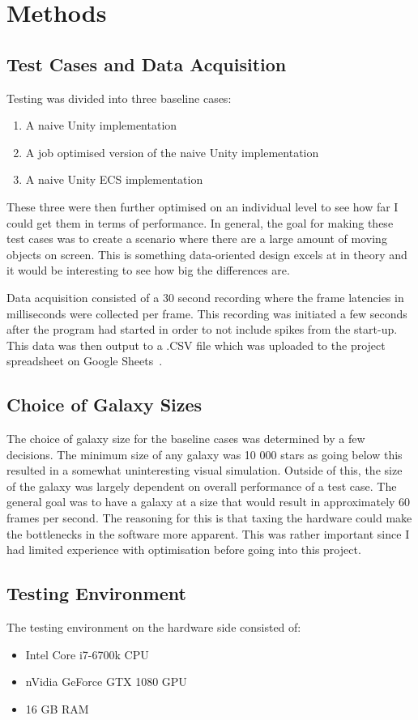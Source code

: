 \chapter{Methods}
\section{Test Cases and Data Acquisition}
Testing was divided into three baseline cases:
\begin{enumerate}
    \item A naive Unity implementation
    \item A job optimised version of the naive Unity implementation
    \item A naive Unity ECS implementation
\end{enumerate}
These three were then further optimised on an individual level to see how far I could get them in terms of performance. In general, the goal for making these test cases was to create a scenario where there are a large amount of moving objects on screen. This is something data-oriented design excels at in theory and it would be interesting to see how big the differences are. 

Data acquisition consisted of a 30 second recording where the frame latencies in milliseconds were collected per frame. This recording was initiated a few seconds after the program had started in order to not include spikes from the start-up. This data was then output to a .CSV file which was uploaded to the project spreadsheet on Google Sheets~\cite{projectSpreadsheet}.

\section{Choice of Galaxy Sizes}
The choice of galaxy size for the baseline cases was determined by a few decisions. The minimum size of any galaxy was 10 000 stars as going below this resulted in a somewhat uninteresting visual simulation. Outside of this, the size of the galaxy was largely dependent on overall performance of a test case. The general goal was to have a galaxy at a size that would result in approximately 60 frames per second. The reasoning for this is that taxing the hardware could make the bottlenecks in the software more apparent. This was rather important since I had limited experience with optimisation before going into this project.  

\section{Testing Environment}
The testing environment on the hardware side consisted of:
\begin{itemize}
    \item Intel Core i7-6700k CPU
    \item nVidia GeForce GTX 1080 GPU
    \item 16 GB RAM
\end{itemize}

